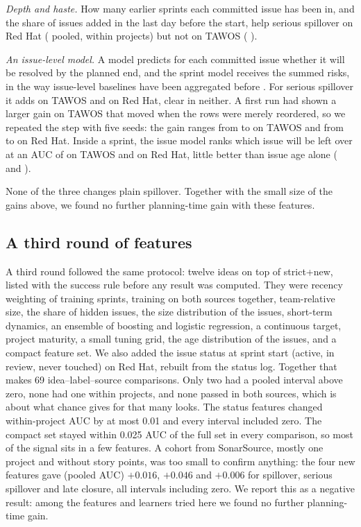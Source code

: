 \emph{Depth and haste.} How many earlier sprints each committed issue has been in, and the share of issues added in the last day before the start, help serious spillover on Red Hat (\dQRDepSs{} \cQRDepSs{} pooled, \dWRDepSs{} \cWRDepSs{} within projects) but not on TAWOS (\dQTDepSs{} \cQTDepSs).

\emph{An issue-level model.} A model predicts for each committed issue whether it will be resolved by the planned end, and the sprint model receives the summed risks, in the way issue-level baselines have been aggregated before \cite{sprint2vec}. For serious spillover it adds \dQTIssSs{} \cQTIssSs{} on TAWOS and \dQRIssSs{} \cQRIssSs{} on Red Hat, clear in neither. A first run had shown a larger gain on TAWOS that moved when the rows were merely reordered, so we repeated the step with five seeds: the gain ranges from \QSeedMinT{} to \QSeedMaxT{} on TAWOS and from \QSeedMinR{} to \QSeedMaxR{} on Red Hat. Inside a sprint, the issue model ranks which issue will be left over at an AUC of \QRankT{} on TAWOS and \QRankR{} on Red Hat, little better than issue age alone (\QAgeT{} and \QAgeR).

None of the three changes plain spillover. Together with the small size of the gains above, we found no further planning-time gain with these features.

\subsection{A third round of features}
\label{sec:round3}

A third round followed the same protocol: twelve ideas on top of strict+new, listed with the success rule before any result was computed. They were recency weighting of training sprints, training on both sources together, team-relative size, the share of hidden issues, the size distribution of the issues, short-term dynamics, an ensemble of boosting and logistic regression, a continuous target, project maturity, a small tuning grid, the age distribution of the issues, and a compact feature set. We also added the issue status at sprint start (active, in review, never touched) on Red Hat, rebuilt from the status log. Together that makes 69 idea--label--source comparisons. Only two had a pooled interval above zero, none had one within projects, and none passed in both sources, which is about what chance gives for that many looks. The status features changed within-project AUC by at most 0.01 and every interval included zero. The compact set stayed within 0.025 AUC of the full set in every comparison, so most of the signal sits in a few features. A cohort from SonarSource, mostly one project and without story points, was too small to confirm anything: the four new features gave (pooled AUC) $+0.016$, $+0.046$ and $+0.006$ for spillover, serious spillover and late closure, all intervals including zero. We report this as a negative result: among the features and learners tried here we found no further planning-time gain.

